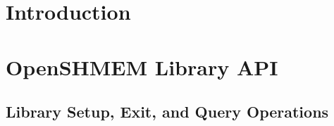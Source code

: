 \documentclass[10pt]{book}
\begin{document}
\hypersetup{pageanchor=true,citecolor=blue}

\pagestyle{fancy}
\fancyhead{}
\fancyhead[LE,LO]{\insertDocVersion}
\fancyfoot[CE,CO]{\thepage}

\setcounter{tocdepth}{3}
\tableofcontents
\mainmatter  %
\pagestyle{fancy} \withlinenumbers%
\fancyhf{}
\fancyhead[RE, LO]{\rightmark}
\fancyhead[RO, LE]{\thepage}
\renewcommand{\headrulewidth}{0pt}
\renewcommand{\thesection}{\arabic{section}}
{ %
\setlength{\parskip}{3pt} %
\startchap
\section*{Introduction}
\label{sec:intro}
%
%
%

\label{subsec:osh_project}

\label{subsec:programming_model}

\label{subsec:memory_model}

%

\label{subsec:library_constants}

\label{subsec:environment_variables}
\label{subsec:language_bindings}

\clearpage

\startchap
\section{OpenSHMEM Library API}
\label{sec:openshmem_library_api}
\cbstart \subsection{Library Setup, Exit, and Query Operations} \cbend %

\label{subsec:start_pes}
\label{subsec:shmem_my_pe}
\label{subsec:shmem_num_pe}
\cbstart  \cbend %
\label{subsec:shmem_finalize}
\label{subsec:shmem_pe_accessible}
\label{subsec:shmem_addr_accessible}
\cbstart  %
\label{subsec:shmem_version}
 \cbend %
\label{subsec:shmem_name}
}
\end{document}
